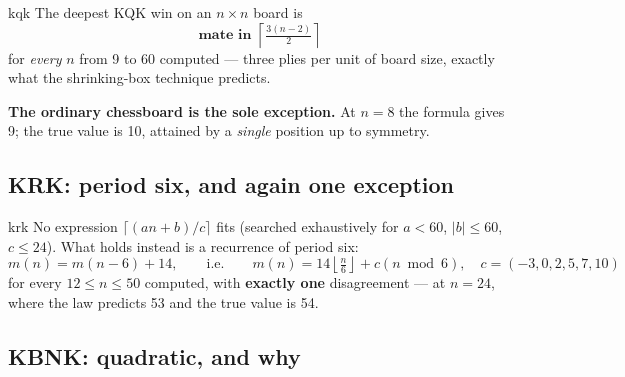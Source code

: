 \documentclass[11pt]{article}
\begin{document}
\begin{result}[title={KQK depth law}]{kqk}
The deepest KQK win on an $n\times n$ board is
\[ \textbf{mate in } \left\lceil \tfrac{3(n-2)}{2} \right\rceil \]
for \emph{every} $n$ from 9 to 60 computed --- three plies per unit of board
size, exactly what the shrinking-box technique predicts.

\smallskip
\textbf{The ordinary chessboard is the sole exception.} At $n=8$ the formula
gives 9; the true value is 10, attained by a \emph{single} position up to
symmetry.
\end{result}

\subsection{KRK: period six, and again one exception}\label{sub:krk-law}

\begin{result}[title={KRK depth law}]{krk}
No expression $\lceil (an+b)/c \rceil$ fits (searched exhaustively for
$a<60$, $|b|\le 60$, $c\le 24$). What holds instead is a recurrence of
period six:
\[ m(n) = m(n-6) + 14, \qquad\text{i.e.}\qquad
   m(n) = 14\left\lfloor \tfrac{n}{6} \right\rfloor + c(n \bmod 6),
   \quad c = (-3,0,2,5,7,10) \]
for every $12 \le n \le 50$ computed, with \textbf{exactly one} disagreement
--- at $n = 24$, where the law predicts 53 and the true value is 54.
\end{result}

\subsection{KBNK: quadratic, and why}\label{sub:kbnk-law}

\begin{center}
\end{center}
\end{document}
